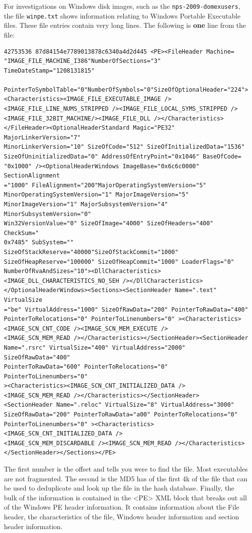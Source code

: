 For investigations on Windows disk images, such as the \texttt{nps-2009-domexusers}, the file \texttt{winpe.txt} shows information relating to Windows Portable Executable files.  These file entries contain very long lines. The following is \textbf{one} line from the file:
\lstset{style=customfile}
\begin{lstlisting}
42753536 87d84154e7789013878c6340a4d2d445 <PE><FileHeader Machine=
"IMAGE_FILE_MACHINE_I386"NumberOfSections="3" TimeDateStamp="1208131815"
 PointerToSymbolTable="0"NumberOfSymbols="0"SizeOfOptionalHeader="224">
<Characteristics><IMAGE_FILE_EXECUTABLE_IMAGE />
<IMAGE_FILE_LINE_NUMS_STRIPPED /><IMAGE_FILE_LOCAL_SYMS_STRIPPED />
<IMAGE_FILE_32BIT_MACHINE/><IMAGE_FILE_DLL /></Characteristics>
</FileHeader><OptionalHeaderStandard Magic="PE32" MajorLinkerVersion="7" 
MinorLinkerVersion="10" SizeOfCode="512" SizeOfInitializedData="1536" 
SizeOfUninitializedData="0" AddressOfEntryPoint="0x1046" BaseOfCode=
"0x1000" /><OptionalHeaderWindows ImageBase="0x6c6c0000" SectionAlignment
="1000" FileAlignment="200"MajorOperatingSystemVersion="5" 
MinorOperatingSystemVersion="1" MajorImageVersion="5" 
MinorImageVersion="1" MajorSubsystemVersion="4" MinorSubsystemVersion="0" 
Win32VersionValue="0" SizeOfImage="4000" SizeOfHeaders="400" CheckSum="
0x7485" SubSystem="" SizeOfStackReserve="40000"SizeOfStackCommit="1000"
SizeOfHeapReserve="100000" SizeOfHeapCommit="1000" LoaderFlags="0"
NumberOfRvaAndSizes="10"><DllCharacteristics>
<IMAGE_DLL_CHARACTERISTICS_NO_SEH /></DllCharacteristics>
</OptionalHeaderWindows><Sections><SectionHeader Name=".text" VirtualSize
="be" VirtualAddress="1000" SizeOfRawData="200" PointerToRawData="400" 
PointerToRelocations="0" PointerToLinenumbers="0" ><Characteristics>
<IMAGE_SCN_CNT_CODE /><IMAGE_SCN_MEM_EXECUTE />
<IMAGE_SCN_MEM_READ /></Characteristics></SectionHeader><SectionHeader 
Name=".rsrc" VirtualSize="400" VirtualAddress="2000" SizeOfRawData="400" 
PointerToRawData="600" PointerToRelocations="0" PointerToLinenumbers="0"
><Characteristics><IMAGE_SCN_CNT_INITIALIZED_DATA />
<IMAGE_SCN_MEM_READ /></Characteristics></SectionHeader>
<SectionHeader Name=".reloc" VirtualSize="8" VirtualAddress="3000" 
SizeOfRawData="200" PointerToRawData="a00" PointerToRelocations="0" 
PointerToLinenumbers="0" ><Characteristics><IMAGE_SCN_CNT_INITIALIZED_DATA />
<IMAGE_SCN_MEM_DISCARDABLE /><IMAGE_SCN_MEM_READ /></Characteristics>
</SectionHeader></Sections></PE>
\end{lstlisting}
The first number is the offset and tells you were to find the file. Most executables are not fragmented. The second is the MD5 has of the first 4k of the file that can be used to deduplicate and look up the file in the hash database. Finally, the bulk of the information is contained in the <PE> XML block that breaks out all of the Windows PE header information. It contains information about the File header, the characteristics of the file, Windows header information and section header information.\\

